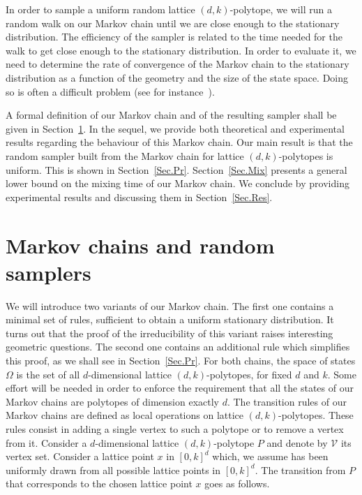 \documentclass[a4paper]{article}
\begin{document}
In order to sample a uniform random lattice $(d,k)$-polytope, we will run a random walk on our Markov chain until we are close enough to the stationary distribution. The efficiency of the sampler is related to the time needed for the walk to get close enough to the stationary distribution. In order to evaluate it, we need to determine the rate of convergence of the Markov chain to the stationary distribution as a function of the geometry and the size of the state space. Doing so is often a difficult problem (see for instance~\cite{carnino2011random,melanccon2001random}).

A formal definition of our Markov chain and of the resulting sampler shall be given in Section~\ref{Sec.MC}. In the sequel, we provide both theoretical and experimental results regarding the behaviour of this Markov chain. Our main result is that the random sampler built from the Markov chain for lattice $(d,k)$-polytopes is uniform. This is shown in Section~\ref{Sec.Pr}. Section~\ref{Sec.Mix} presents a general lower bound on the mixing time of our Markov chain. We conclude by providing experimental results and discussing them in Section~\ref{Sec.Res}.

\section{Markov chains and random samplers}\label{Sec.MC}

We will introduce two variants of our Markov chain. The first one contains a minimal set of rules, sufficient to obtain a uniform stationary distribution. It turns out that the proof of the irreducibility of this variant raises interesting geometric questions. The second one contains an additional rule which simplifies this proof, as we shall see in Section~\ref{Sec.Pr}. For both chains, the space of states $\Omega$ is the set of all $d$-dimensional lattice $(d,k)$-polytopes, for fixed $d$ and $k$. Some effort will be needed in order to enforce the requirement that all the states of our Markov chains are polytopes of dimension exactly $d$. The transition rules of our Markov chains are defined as local operations on lattice $(d,k)$-polytopes. These rules consist in adding a single vertex to such a polytope or to remove a vertex from it. Consider a $d$-dimensional lattice $(d,k)$-polytope $P$ and denote by $\mathcal{V}$ its vertex set. Consider a lattice point $x$ in $[0,k]^d$ which, we assume has been uniformly drawn from all possible lattice points in $[0,k]^d$. The transition from $P$ that corresponds to the chosen lattice point $x$ goes as follows.
\end{document}
